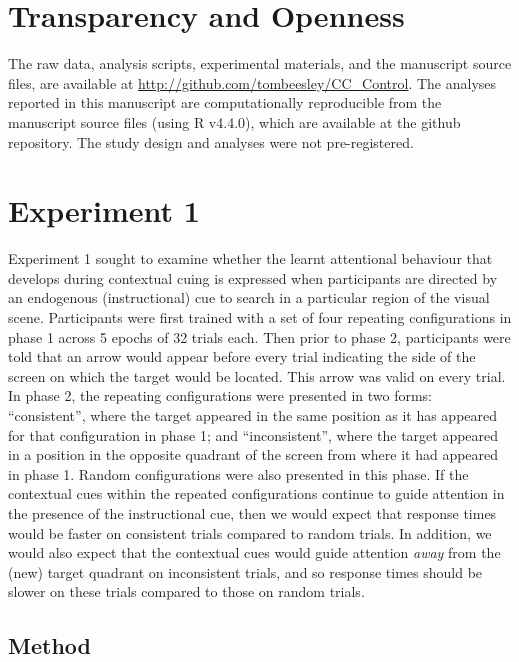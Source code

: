 \documentclass[
  man,
  floatsintext,
  longtable,
  nolmodern,
  notxfonts,
  notimes,
  colorlinks=true,linkcolor=blue,citecolor=blue,urlcolor=blue]{apa7}
\begin{document}
\section{Transparency and Openness}\label{transparency-and-openness}

The raw data, analysis scripts, experimental materials, and the
manuscript source files, are available at
\url{http://github.com/tombeesley/CC_Control}. The analyses reported in
this manuscript are computationally reproducible from the manuscript
source files (using R v4.4.0), which are available at the github
repository. The study design and analyses were not pre-registered.

\section{Experiment 1}\label{experiment-1}

Experiment 1 sought to examine whether the learnt attentional behaviour
that develops during contextual cuing is expressed when participants are
directed by an endogenous (instructional) cue to search in a particular
region of the visual scene. Participants were first trained with a set
of four repeating configurations in phase 1 across 5 epochs of 32 trials
each. Then prior to phase 2, participants were told that an arrow would
appear before every trial indicating the side of the screen on which the
target would be located. This arrow was valid on every trial. In phase
2, the repeating configurations were presented in two forms:
``consistent'', where the target appeared in the same position as it has
appeared for that configuration in phase 1; and ``inconsistent'', where
the target appeared in a position in the opposite quadrant of the screen
from where it had appeared in phase 1. Random configurations were also
presented in this phase. If the contextual cues within the repeated
configurations continue to guide attention in the presence of the
instructional cue, then we would expect that response times would be
faster on consistent trials compared to random trials. In addition, we
would also expect that the contextual cues would guide attention
\emph{away} from the (new) target quadrant on inconsistent trials, and
so response times should be slower on these trials compared to those on
random trials.

\subsection{Method}\label{method}
\end{document}
